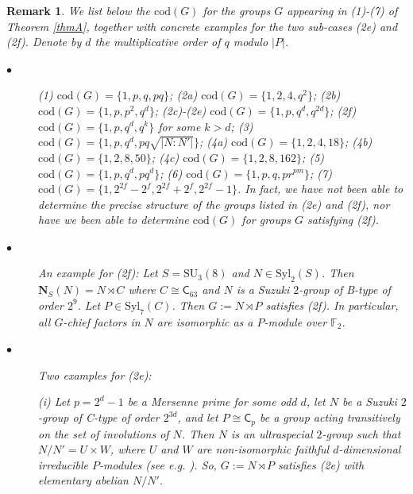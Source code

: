 \documentclass[9pt]{article}
\newtheorem*{rmkA}{\bf Remark}
\begin{document}
\begin{rmkA}
	{\rm We list below the $\mathrm{cod}(G)$ for the groups $G$ appearing in (1)-(7) of Theorem \ref{thmA}, 
	together with concrete examples for the two sub-cases (2e) and (2f). Denote by $d$ the multiplicative order of $q$ modulo $|P|$. 
\begin{description}
	\item[$\bullet$] (1) $\mathrm{cod}(G)=\{ 1,p,q,pq \}$;
	(2a) $\mathrm{cod}(G)=\{ 1,2,4,q^{2} \}$;
	(2b) $\mathrm{cod}(G)=\{ 1,p,p^{2},q^{d} \}$;
	(2c)-(2e) $\mathrm{cod}(G)=\{ 1,p,q^{d},q^{2d} \}$;
	(2f) $\mathrm{cod}(G)=\{ 1,p,q^{d}, q^{k}\}$ for some $k>d$;
	(3)  $\mathrm{cod}(G)=\{ 1,p,q^{d}, pq \sqrt{|N:N'|} \}$; 
	(4a) $\mathrm{cod}(G)=\{ 1,2,4, 18 \}$;
	(4b) $\mathrm{cod}(G)=\{ 1,2,8, 50 \}$;
	(4c) $\mathrm{cod}(G)=\{ 1,2,8, 162 \}$;
	(5) $\mathrm{cod}(G)=\{ 1,p,q^{d},pq^{d} \}$;
	(6) $\mathrm{cod}(G)=\{ 1,p,q, pr^{pm} \}$;
	(7) $\mathrm{cod}(G)=\{ 1, 2^{2f}-2^{f},2^{2f}+2^{f}, 2^{2f}-1 \}$.
	In fact, we have not been able to determine the precise structure of the groups listed in (2e) and (2f), nor have we been able to determine $\mathrm{cod}(G)$ for groups $G$ satisfying (2f).
  \item[$\bullet$]   An example for (2f):
  Let $S=\mathrm{SU}_3(8)$ and $N\in \mathrm{Syl}_{2}(S)$.
  Then $\mathbf{N}_{S}(N)=N \rtimes C$ where $C\cong \mathsf{C}_{63}$ and $N$ is a Suzuki $2$-group of B-type of order $2^{9}$.
  Let $P\in \mathrm{Syl}_{7}(C)$.
  Then $G:=N \rtimes P$ satisfies (2f).
  In particular, all $G$-chief factors in $N$ are isomorphic as a $P$-module over $\mathbb{F}_2$.
  \item[$\bullet$] Two examples for (2e): 
  
 (i) Let $p=2^{d}-1$ be a Mersenne prime for some odd $d$,
	let $N$ be a Suzuki $2$-group of C-type of order $2^{3d}$, and let $P\cong \mathsf{C}_{p}$ be
	a group acting transitively on the set of involutions of $N$.
	Then $N$ is an ultraspecial $2$-group such that $N/N'=U\times W$, where $U$ and $W$ are non-isomorphic faithful 
	$d$-dimensional irreducible $P$-modules (see e.g. \cite{higman1963,lewis2017}).
	So, $G:=N \rtimes P$ satisfies (2e) with elementary abelian $N/N'$.



\end{description}}
\end{rmkA}
\end{document}

